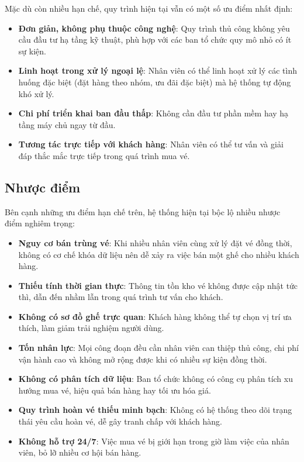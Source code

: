 \documentclass[../main.tex]{subfiles}
\begin{document}
Mặc dù còn nhiều hạn chế, quy trình hiện tại vẫn có một số ưu điểm nhất định:

\begin{itemize}
    \item \textbf{Đơn giản, không phụ thuộc công nghệ}: Quy trình thủ công không yêu cầu đầu tư hạ tầng kỹ thuật, phù hợp với các ban tổ chức quy mô nhỏ có ít sự kiện.
    \item \textbf{Linh hoạt trong xử lý ngoại lệ}: Nhân viên có thể linh hoạt xử lý các tình huống đặc biệt (đặt hàng theo nhóm, ưu đãi đặc biệt) mà hệ thống tự động khó xử lý.
    \item \textbf{Chi phí triển khai ban đầu thấp}: Không cần đầu tư phần mềm hay hạ tầng máy chủ ngay từ đầu.
    \item \textbf{Tương tác trực tiếp với khách hàng}: Nhân viên có thể tư vấn và giải đáp thắc mắc trực tiếp trong quá trình mua vé.
\end{itemize}

\subsection{Nhược điểm}

Bên cạnh những ưu điểm hạn chế trên, hệ thống hiện tại bộc lộ nhiều nhược điểm nghiêm trọng:

\begin{itemize}
    \item \textbf{Nguy cơ bán trùng vé}: Khi nhiều nhân viên cùng xử lý đặt vé đồng thời, không có cơ chế khóa dữ liệu nên dễ xảy ra việc bán một ghế cho nhiều khách hàng.
    \item \textbf{Thiếu tính thời gian thực}: Thông tin tồn kho vé không được cập nhật tức thì, dẫn đến nhầm lẫn trong quá trình tư vấn cho khách.
    \item \textbf{Không có sơ đồ ghế trực quan}: Khách hàng không thể tự chọn vị trí ưa thích, làm giảm trải nghiệm người dùng.
    \item \textbf{Tốn nhân lực}: Mọi công đoạn đều cần nhân viên can thiệp thủ công, chi phí vận hành cao và không mở rộng được khi có nhiều sự kiện đồng thời.
    \item \textbf{Không có phân tích dữ liệu}: Ban tổ chức không có công cụ phân tích xu hướng mua vé, hiệu quả bán hàng hay tối ưu hóa giá.
    \item \textbf{Quy trình hoàn vé thiếu minh bạch}: Không có hệ thống theo dõi trạng thái yêu cầu hoàn vé, dễ gây tranh chấp với khách hàng.
    \item \textbf{Không hỗ trợ 24/7}: Việc mua vé bị giới hạn trong giờ làm việc của nhân viên, bỏ lỡ nhiều cơ hội bán hàng.
\end{itemize}
\end{document}
